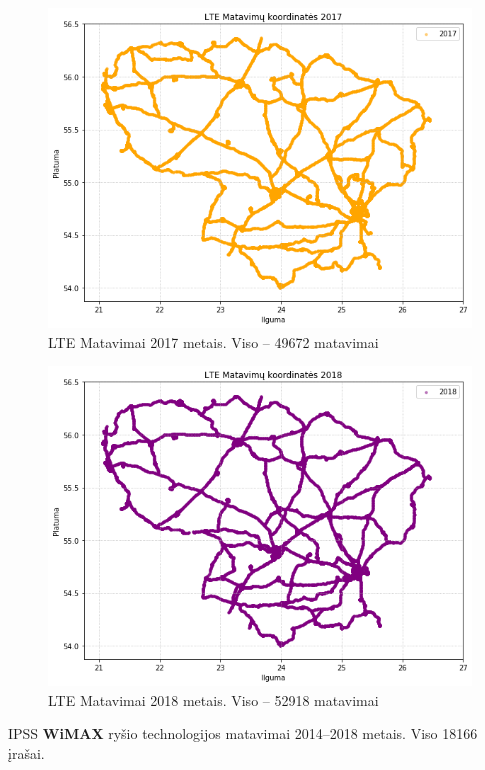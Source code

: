 \documentclass{VUMIFPSbakalaurinis}
\begin{document}
\begin{figure}[H]
	\centering
	\includegraphics[scale=0.33]{img/LTE-4}
	\caption{LTE Matavimai 2017 metais. Viso – 49672 matavimai}
	\label{img:LTE-4}
\end{figure}
\begin{figure}[H]
	\centering
	\includegraphics[scale=0.33]{img/LTE-5}
	\caption{LTE Matavimai 2018 metais. Viso – 52918 matavimai}
	\label{img:LTE-5}
\end{figure}
IPSS \textbf{WiMAX} ryšio technologijos matavimai 2014–2018 metais. Viso 18166 įrašai.
\end{document}
